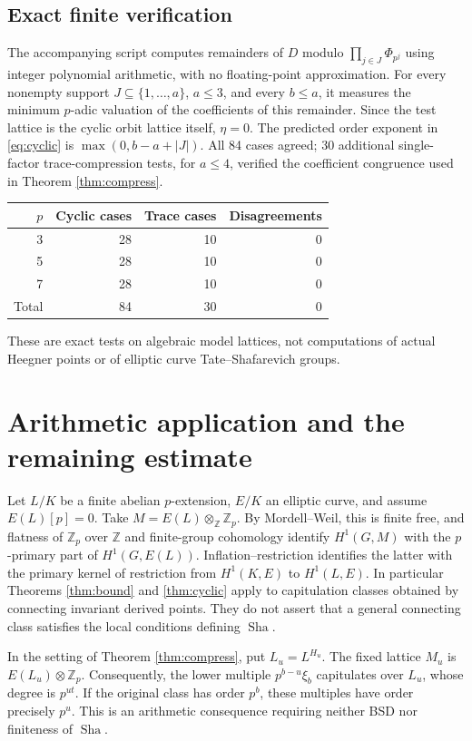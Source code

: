 \documentclass[11pt]{article}
\theoremstyle{definition}\newtheorem{definition}[theorem]{Definition}\newtheorem{example}[theorem]{Example}
\theoremstyle{remark}\newtheorem{remark}[theorem]{Remark}
\newcommand{\Zp}{\mathbb Z_p}\newcommand{\Qp}{\mathbb Q_p}\newcommand{\Fp}{\mathbb F_p}
\newcommand{\Sha}{\mathop{\mathrm{Sha}}}\newcommand{\Gal}{\operatorname{Gal}}\newcommand{\ord}{\operatorname{ord}}\newcommand{\Tr}{\operatorname{Tr}}\newcommand{\im}{\operatorname{im}}\newcommand{\rk}{\operatorname{rank}}
\begin{document}
\subsection{Exact finite verification}
The accompanying script computes remainders of $D$ modulo $\prod_{j\in J}\Phi_{p^j}$ using integer polynomial arithmetic, with no floating-point approximation. For every nonempty support $J\subseteq\{1,\ldots,a\}$, $a\le3$, and every $b\le a$, it measures the minimum $p$-adic valuation of the coefficients of this remainder. Since the test lattice is the cyclic orbit lattice itself, $\eta=0$. The predicted order exponent in \eqref{eq:cyclic} is $\max(0,b-a+|J|)$. All 84 cases agreed; 30 additional single-factor trace-compression tests, for $a\le4$, verified the coefficient congruence used in Theorem \ref{thm:compress}.
\begin{center}
\begin{tabular}{rrrr}\toprule
$p$ & Cyclic cases & Trace cases & Disagreements\\\midrule
3&28&10&0\\5&28&10&0\\7&28&10&0\\\midrule
Total&84&30&0\\\bottomrule
\end{tabular}
\end{center}
These are exact tests on algebraic model lattices, not computations of actual Heegner points or of elliptic curve Tate--Shafarevich groups.

\section{Arithmetic application and the remaining estimate}
Let $L/K$ be a finite abelian $p$-extension, $E/K$ an elliptic curve, and assume $E(L)[p]=0$. Take $M=E(L)\otimes_{\mathbb Z}\Zp$. By Mordell--Weil, this is finite free, and flatness of $\Zp$ over $\mathbb Z$ and finite-group cohomology identify $H^1(G,M)$ with the $p$-primary part of $H^1(G,E(L))$. Inflation--restriction identifies the latter with the primary kernel of restriction from $H^1(K,E)$ to $H^1(L,E)$. In particular Theorems \ref{thm:bound} and \ref{thm:cyclic} apply to capitulation classes obtained by connecting invariant derived points. They do not assert that a general connecting class satisfies the local conditions defining $\Sha$.

In the setting of Theorem \ref{thm:compress}, put $L_u=L^{H_u}$. The fixed lattice $M_u$ is $E(L_u)\otimes\Zp$. Consequently, the lower multiple $p^{b-u}\xi_b$ capitulates over $L_u$, whose degree is $p^{ut}$. If the original class has order $p^b$, these multiples have order precisely $p^u$. This is an arithmetic consequence requiring neither BSD nor finiteness of $\Sha$.
\end{document}
